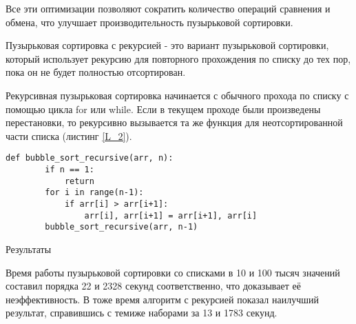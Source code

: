 \documentclass[oneside,14pt]{extarticle} %
\begin{document}
	Все эти оптимизации позволяют сократить количество операций сравнения и обмена, что улучшает производительность пузырьковой сортировки.
	
	Пузырьковая сортировка с рекурсией - это вариант пузырьковой сортировки, который использует рекурсию для повторного прохождения по списку до тех пор, пока он не будет полностью отсортирован.
	
	Рекурсивная пузырьковая сортировка начинается с обычного прохода по списку с помощью цикла for или while. Если в текущем проходе были произведены перестановки, то рекурсивно вызывается та же функция для неотсортированной части списка (листинг \ref{L_2}).
	
	\begin{lstlisting}[caption={Алгоритм рекурсивной пузырьковой сортировки}]
	def bubble_sort_recursive(arr, n):
		if n == 1:
			return
		for i in range(n-1):
			if arr[i] > arr[i+1]:
				arr[i], arr[i+1] = arr[i+1], arr[i]
		bubble_sort_recursive(arr, n-1)
	\end{lstlisting}\label{L_2}
	
	\begin{center}
		Результаты
	\end{center}
		
	Время работы пузырьковой сортировки со списками в 10 и 100 тысяч значений составил порядка 22 и 2328 секунд соответственно, что доказывает её неэффективность. 
	В тоже время алгоритм с рекурсией показал наилучший результат, справившись с темиже наборами за 13 и 1783 секунд.
	
\end{document}
